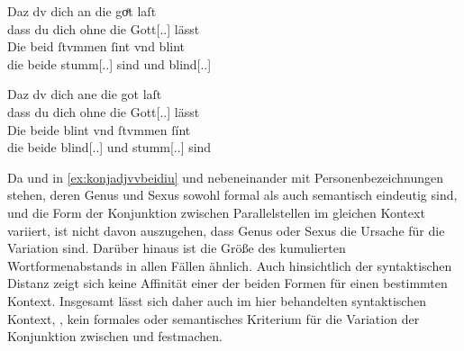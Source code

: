 \begin{exe}
\begin{xlist}
	\ex \label{ex:konjadjvvbeide_4} %
		\begin{taggedline}{\parencites[\pno~30rb,60--30rc,1]{kc:B1}[zu][10900\psqq]{schroeder1895}}
		\gll Daz dv dich an die goͤt laſt \\
			dass du dich ohne die Gott[\Nom.\Pl.\MascX] lässt \\
	\sn \gll Die beid ſtvmmen ſint vnd blint \\
			die beide stumm[\Nom.\Pl.\MascM] sind und blind[\Nom.\Pl.\MascM] \\
		\end{taggedline}
	
	\ex \label{ex:konjadjvvbeide_5} %
		\gll Daz dv dich ane die got laſt \\
			dass du dich ohne die Gott[\Nom.\Pl.\MascX] lässt \\
	\sn \gll Die beide blint vnd ſtvmmen ſínt \\
			die beide blind[\Nom.\Pl.\MascM] und stumm[\Nom.\Pl.\MascM] sind \\
		\begin{taggedline}{\parencites[\pno~51va,29--30]{kc:VB}[zu][10900\psqq]{schroeder1895}}
		\trans {}
		\end{taggedline}
	\end{xlist}
\end{exe}

Da  und  in \cref{ex:konjadjvvbeidiu} und
 nebeneinander mit
Personenbezeichnungen stehen, deren Genus und Sexus sowohl formal als auch
semantisch eindeutig sind, und die Form der Konjunktion zwischen
Parallelstellen im gleichen Kontext variiert, ist nicht davon auszugehen, dass
Genus oder Sexus die Ursache für die Variation sind. Darüber hinaus ist die
Größe des kumulierten Wortformenabstands in allen Fällen ähnlich. Auch
hinsichtlich der syntaktischen Distanz zeigt sich keine Affinität einer der
beiden Formen für einen bestimmten Kontext. Insgesamt lässt sich daher auch im
hier behandelten syntaktischen Kontext, , kein formales oder semantisches Kriterium für die
Variation der Konjunktion zwischen  und  festmachen.


